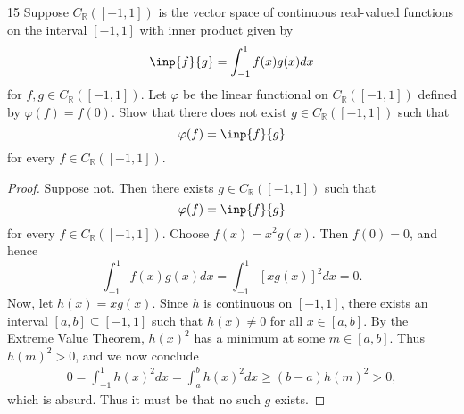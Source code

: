 \documentclass{extarticle}
\newenvironment{problem}[1]{\begin{prob*}{#1}{}}{\end{prob*}}
\newcommand{\R}{\mathbb{R}}
\begin{document}
\begin{problem}{15}
Suppose $C_\R([-1, 1])$ is the vector space of continuous real-valued functions on the interval $[-1, 1]$ with inner product given by
\begin{equation*}
\inp{f}{g} = \int_{-1}^1f(x)g(x)dx
\end{equation*}
for $f,g\in C_\R([-1, 1])$.  Let $\varphi$ be the linear functional on $C_\R([-1, 1])$ defined by $\varphi(f) = f(0)$.  Show that there does not exist $g\in C_\R([-1,1])$ such that 
\begin{equation*}
\varphi(f) = \inp{f}{g}
\end{equation*}
for every $f\in C_\R([-1, 1])$.  
\end{problem}
\begin{proof}
Suppose not.  Then there exists $g\in C_\R([-1,1])$ such that 
\begin{equation*}
\varphi(f) = \inp{f}{g}
\end{equation*}
for every $f\in C_\R([-1, 1])$.  Choose $f(x) = x^2 g(x)$.  Then $f(0) = 0$, and hence
\begin{equation*}
\int_{-1}^1 f(x) g(x)dx = \int_{-1}^1 [xg(x)]^2dx = 0.
\end{equation*}
Now, let $h(x) = xg(x)$.  Since $h$ is continuous on $[-1, 1]$, there exists an interval $[a, b]\subseteq [-1, 1]$ such that $h(x)\neq 0$ for all $x \in [a, b]$.  By the Extreme Value Theorem, $h(x)^2$ has a minimum at some $m\in[a,b]$.  Thus $h(m)^2> 0$, and we now conclude
\begin{align*}
0 = \int_{-1}^1h(x)^2dx = \int_a^bh(x)^2dx \geq (b-a)h(m)^2 > 0,
\end{align*} 
which is absurd.  Thus it must be that no such $g$ exists.
\end{proof}
\end{document}
